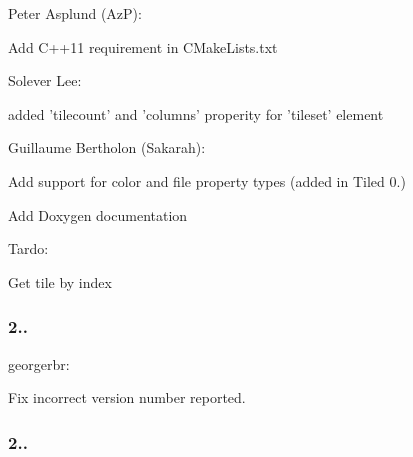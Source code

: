 \begin{DoxyItemize}
\begin{DoxyItemize}
\end{DoxyItemize}
\item Peter Asplund (Az\-P)\-:
\begin{DoxyItemize}
\item Add C++11 requirement in C\-Make\-Lists.\-txt
\end{DoxyItemize}
\item Solever Lee\-:
\begin{DoxyItemize}
\item added 'tilecount' and 'columns' properity for 'tileset' element
\end{DoxyItemize}
\item Guillaume Bertholon (Sakarah)\-:
\begin{DoxyItemize}
\item Add support for color and file property types (added in Tiled 0.)
\item Add Doxygen documentation
\end{DoxyItemize}
\item Tardo\-:
\begin{DoxyItemize}
\item Get tile by index
\end{DoxyItemize}
\end{DoxyItemize}

\subsubsection*{2..}


\begin{DoxyItemize}
\item georgerbr\-:
\begin{DoxyItemize}
\item Fix incorrect version number reported.
\end{DoxyItemize}
\end{DoxyItemize}

\subsubsection*{2..}


